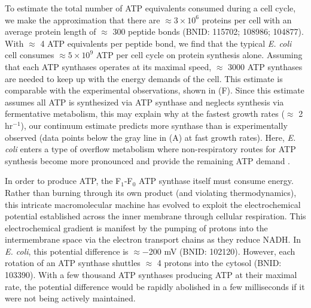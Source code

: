 To estimate the total number of ATP equivalents consumed during a cell cycle, we
make the approximation that there are $\approx 3\times10^6$ proteins per cell
with an average protein length of $\approx$ 300 peptide bonds (BNID: 115702;
108986; 104877). With $\approx$ 4 ATP equivalents per peptide bond, we find that
the typical \textit{E. coli} cell consumes $\approx 5 \times 10^9$ ATP per cell
cycle on protein synthesis alone. Assuming that each ATP synthases operates at
its maximal speed, $\approx$ 3000 ATP synthases are needed to keep up with the
energy demands of the cell. This estimate is comparable with the experimental
observations, shown in (F). Since this estimate
assumes all ATP is synthesized via ATP synthase and neglects synthesis via
fermentative metabolism, this may explain why at the fastest growth rates
($\approx$ 2 hr$^{-1}$), our continuum estimate predicts more synthase than is
experimentally observed (data points below the gray line in
(A) at fast growth rates). Here, \textit{E. coli} enters
a type of overflow metabolism where non-respiratory routes for ATP synthesis
become more pronounced and provide the remaining ATP demand \citep{molenaar2009,
zhuang2011, szenk2017} .

In order to produce ATP, the F$_1$-F$_0$ ATP synthase itself must consume
energy. Rather than burning through its own product (and violating
thermodynamics), this intricate macromolecular machine has evolved to exploit
the electrochemical potential established across the inner membrane through
cellular respiration. This electrochemical gradient is manifest by the pumping
of protons into the intermembrane space via the electron transport chains as
they reduce NADH. In \textit{E. coli}, this potential difference is $\approx
-$200 mV (BNID: 102120).
However, each rotation of an ATP
synthase shuttles $\approx$ 4 protons into the cytosol (BNID: 103390). With a few thousand ATP
synthases producing ATP at their maximal rate, the potential difference would be
rapidly abolished in a few milliseconds if it were not being actively
maintained.

